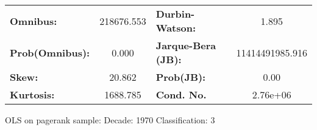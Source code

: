 \begin{center}
\begin{tabular}{lccccc}
\bottomrule
\end{tabular}
\begin{tabular}{lclc}
\textbf{Omnibus:}       & 218676.553 & \textbf{  Durbin-Watson:     } &        1.895     \\
\textbf{Prob(Omnibus):} &    0.000   & \textbf{  Jarque-Bera (JB):  } & 11414491985.916  \\
\textbf{Skew:}          &   20.862   & \textbf{  Prob(JB):          } &         0.00     \\
\textbf{Kurtosis:}      &  1688.785  & \textbf{  Cond. No.          } &     2.76e+06     \\
\bottomrule
\end{tabular}
\end{center}
\break
OLS on pagerank sample: Decade: 1970 Classification: 3
